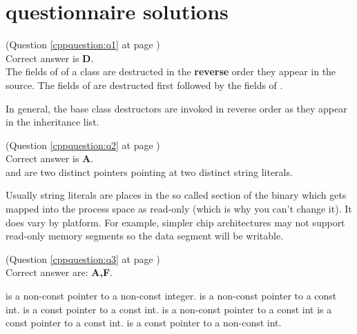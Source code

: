 \chapter{\CC questionnaire solutions}

\begin{cppanswer}
    \label{cppquestion:s1}
    (Question \ref{cppquestion:q1} at page \pageref{cppquestion:q1}) \hfill \\
    Correct answer is \textbf{D}. \\
    The fields of of a class are destructed in the \textbf{reverse} order they appear in the source. 
    The fields of  are destructed first followed by the fields of . 
    
    In general, the base class destructors are invoked in reverse order as they appear in the inheritance list.
\end{cppanswer}

\begin{cppanswer}
    \label{cppquestion:s2}
    (Question \ref{cppquestion:q2} at page \pageref{cppquestion:q2}) \hfill \\
    Correct answer is \textbf{A}. \\
     and  are two distinct pointers  pointing at two distinct string literals. 

    Usually string literals are places in  the so called  section of the binary which gets mapped into the process space as read-only (which is why you can't change it).
    It does vary by platform. For example, simpler chip architectures may not support read-only memory segments so the data segment will be writable.
\end{cppanswer}

\begin{cppanswer}
    \label{cppquestion:s3}
    (Question \ref{cppquestion:q3} at page \pageref{cppquestion:q3}) \hfill \\
    Correct answer are: \textbf{A,F}. \\
    \begin{choices}
        \choice {} is a non-const pointer to a non-const integer.
        \choice {} is a non-const pointer to a const int.
        \choice {} is a const pointer to a const int.
        \choice {} is a non-const pointer to a const int
        \choice {} is a const pointer to a const int.
        \choice {} is a const pointer to a non-const int.
       \end{choices}
\end{cppanswer}

